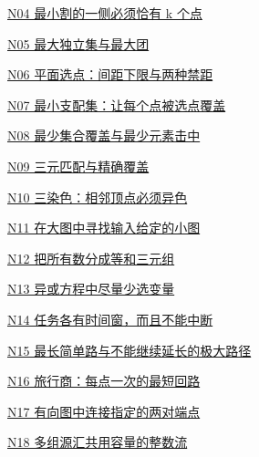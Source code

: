 \documentclass[10pt,a4paper]{article}
\begin{document}
\noindent\hyperref[N04]{N04 最小割的一侧必须恰有 k 个点\nobreak\hfill\pageref*{N04}}\par\vspace{1.5pt}
\noindent\hyperref[N05]{N05 最大独立集与最大团\nobreak\hfill\pageref*{N05}}\par\vspace{1.5pt}
\noindent\hyperref[N06]{N06 平面选点：间距下限与两种禁距\nobreak\hfill\pageref*{N06}}\par\vspace{1.5pt}
\noindent\hyperref[N07]{N07 最小支配集：让每个点被选点覆盖\nobreak\hfill\pageref*{N07}}\par\vspace{1.5pt}
\noindent\hyperref[N08]{N08 最少集合覆盖与最少元素击中\nobreak\hfill\pageref*{N08}}\par\vspace{1.5pt}
\noindent\hyperref[N09]{N09 三元匹配与精确覆盖\nobreak\hfill\pageref*{N09}}\par\vspace{1.5pt}
\noindent\hyperref[N10]{N10 三染色：相邻顶点必须异色\nobreak\hfill\pageref*{N10}}\par\vspace{1.5pt}
\noindent\hyperref[N11]{N11 在大图中寻找输入给定的小图\nobreak\hfill\pageref*{N11}}\par\vspace{1.5pt}
\noindent\hyperref[N12]{N12 把所有数分成等和三元组\nobreak\hfill\pageref*{N12}}\par\vspace{1.5pt}
\noindent\hyperref[N13]{N13 异或方程中尽量少选变量\nobreak\hfill\pageref*{N13}}\par\vspace{1.5pt}
\noindent\hyperref[N14]{N14 任务各有时间窗，而且不能中断\nobreak\hfill\pageref*{N14}}\par\vspace{1.5pt}
\noindent\hyperref[N15]{N15 最长简单路与不能继续延长的极大路径\nobreak\hfill\pageref*{N15}}\par\vspace{1.5pt}
\noindent\hyperref[N16]{N16 旅行商：每点一次的最短回路\nobreak\hfill\pageref*{N16}}\par\vspace{1.5pt}
\noindent\hyperref[N17]{N17 有向图中连接指定的两对端点\nobreak\hfill\pageref*{N17}}\par\vspace{1.5pt}
\noindent\hyperref[N18]{N18 多组源汇共用容量的整数流\nobreak\hfill\pageref*{N18}}\par\vspace{1.5pt}
\end{document}
